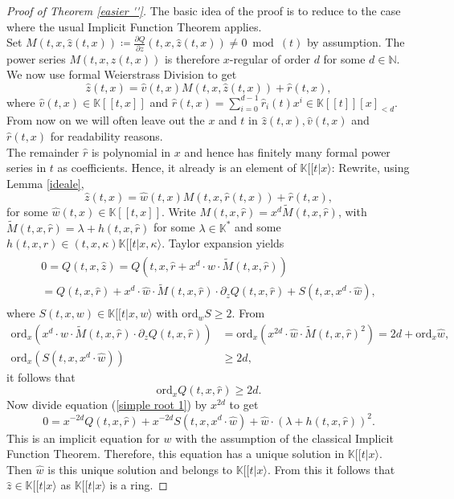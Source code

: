 \documentclass[10pt, a4paper]{article}
\def\wh{\widehat}
\def\wt{\widetilde}
\theoremstyle{remark}
\theoremstyle{remark}
\begin{document}
\begin{proof}[Proof of Theorem \ref{easier ''}]
 The basic idea of the proof is to reduce to the case where the usual Implicit Function Theorem applies. 
 \\Set $M(t,x,\wh{z}(t,x))\coloneqq\frac{\partial Q}{\partial z}(t,x,\wh{z}(t,x))\neq0\bmod (t)$ by assumption. The power series $M(t,x,\wh{z}(t,x))$ is therefore $x$-regular of order $d$ for some $d\in\mathbb{N}$. We now use formal Weierstrass Division to get $$\wh{z}(t,x)=\wh{v}(t,x)M(t,x,\wh{z}(t,x))+\widehat{r}(t,x),$$
 where $\wh{v}(t,x)\in\mathbb{K}[[t,x]]$ and $\widehat{r}(t,x)=\sum_{i=0}^{d-1}\widehat{r}_i(t)x^i\in\mathbb{K}[[t]][x]_{<d}$. From now on we will often leave out the $x$ and $t$ in $\widehat{z}(t,x),\wh{v}(t,x)$ and $\widehat{r}(t,x)$ for readability reasons.
 \\The remainder $\wh{r}$ is polynomial in $x$ and hence has finitely many formal power series in $t$ as coefficients.  Hence, it already is an element of $\mathbb{K}[[t\vert x\rangle$:
 Rewrite, using Lemma \ref{ideale},   $$\wh{z}(t,x)=\wh{w}(t,x)M(t,x,\wh{r}(t,x))+\widehat{r}(t,x),$$
for some $\wh{w}(t,x)\in\mathbb{K}[[t,x]]$.
Write $M(t,x,\wh{r})=x^{d}\wt{M}(t,x,\wh{r})$, with $\wt{M}(t,x,\wh{r})=\lambda+h(t,x,\wh{r})$ for some $\lambda\in\mathbb{K}^*$ and some $h(t,x,r)\in(t,x,\kappa)\mathbb{K}[[t\vert x,\kappa\rangle$. Taylor expansion yields
\begin{align}\label{simple root 1}
\begin{split}
    0=Q(t,x,\wh{z})=Q(t,x,\wh{r}+x^d\cdot \wh{w}\cdot \widetilde{M}(t,x,\wh{r}))\\
    =Q(t,x,\wh{r})+x^d\cdot \wh{w}\cdot \widetilde{M}(t,x,\wh{r})\cdot\partial_zQ(t,x,\wh{r})+S(t,x,x^d\cdot \wh{w}),
\end{split}
\end{align}
where $S(t,x,w)\in\mathbb{K}[[t\vert x,w\rangle$ with $\mathrm{ord}_w S\geq2$. From \begin{align*}
    \mathrm{ord}_x(x^d\cdot\wh{w}\cdot \widetilde{M}(t,x,\wh{r})\cdot\partial_zQ(t,x,\wh{r}))&=\mathrm{ord}_x(x^{2d}\cdot \wh{w}\cdot \widetilde{M}(t,x,\wh{r})^2)=2d+\mathrm{ord}_x\wh{w},\\
    \mathrm{ord}_x(S(t,x,x^d\cdot \wh{w}))&\geq2d,
\end{align*}
it follows that
$$\mathrm{ord}_xQ(t,x,\wh{r})\geq 2d.$$
Now divide equation (\ref{simple root 1}) by $x^{2d}$ to get
$$0=x^{-2d}Q(t,x,\wh{r})+x^{-2d}S(t,x,x^d\cdot \wh{w})+\wh{w}\cdot(\lambda+h(t,x,\wh{r}))^2.$$
This is an implicit equation for $w$ with the assumption of the classical Implicit Function Theorem. Therefore, this equation has a unique solution in $\mathbb{K}[[t\vert x\rangle$. Then $\wh{w}$ is this unique solution and belongs to $\mathbb{K}[[t\vert x\rangle$. From this it follows that $\wh{z}\in\mathbb{K}[[t\vert x\rangle$ as $\mathbb{K}[[t\vert x\rangle$ is a ring.
\end{proof}
\end{document}
